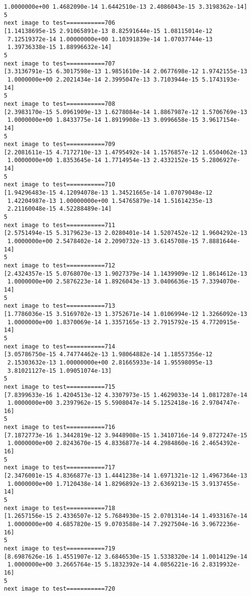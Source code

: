 \documentclass[11pt]{article}
\begin{document}
\begin{Verbatim}[commandchars=\\\{\}]
 1.0000000e+00 1.4682090e-14 1.6442510e-13 2.4086043e-15 3.3198362e-14]
5
next image to test===========706
[1.14138695e-15 2.91065891e-13 8.82591644e-15 1.08115014e-12
 7.12519372e-14 1.00000000e+00 1.10391839e-14 1.07037744e-13
 1.39736338e-15 1.88996632e-14]
5
next image to test===========707
[3.3136791e-15 6.3017598e-13 1.9851610e-14 2.0677698e-12 1.9742155e-13
 1.0000000e+00 2.2021434e-14 2.3995047e-13 3.7103944e-15 5.1743193e-14]
5
next image to test===========708
[2.3983170e-15 5.0961909e-13 1.6278084e-14 1.8867987e-12 1.5706769e-13
 1.0000000e+00 1.8433775e-14 1.8919908e-13 3.0996658e-15 3.9617154e-14]
5
next image to test===========709
[2.2081611e-15 4.7172710e-13 1.4795492e-14 1.1576857e-12 1.6504062e-13
 1.0000000e+00 1.8353645e-14 1.7714954e-13 2.4332152e-15 5.2806927e-14]
5
next image to test===========710
[1.94296483e-15 4.12094078e-13 1.34521665e-14 1.07079048e-12
 1.42204987e-13 1.00000000e+00 1.54765879e-14 1.51614235e-13
 2.21160048e-15 4.52288489e-14]
5
next image to test===========711
[2.5751494e-15 5.3179623e-13 2.0280401e-14 1.5207452e-12 1.9604292e-13
 1.0000000e+00 2.5478402e-14 2.2090732e-13 3.6145708e-15 7.8881644e-14]
5
next image to test===========712
[2.4324357e-15 5.0768070e-13 1.9027379e-14 1.1439909e-12 1.8614612e-13
 1.0000000e+00 2.5876223e-14 1.8926043e-13 3.0406636e-15 7.3394070e-14]
5
next image to test===========713
[1.7786036e-15 3.5169702e-13 1.3752671e-14 1.0106994e-12 1.3266092e-13
 1.0000000e+00 1.8370069e-14 1.3357165e-13 2.7915792e-15 4.7720915e-14]
5
next image to test===========714
[3.05786750e-15 4.74774462e-13 1.98064882e-14 1.18557356e-12
 2.15303632e-13 1.00000000e+00 2.81665933e-14 1.95598095e-13
 3.81021127e-15 1.09051074e-13]
5
next image to test===========715
[7.8399633e-16 1.4204513e-12 4.3307973e-15 1.4629033e-14 1.0817287e-14
 1.0000000e+00 3.2397962e-15 5.5908047e-14 5.1252418e-16 2.9704747e-16]
5
next image to test===========716
[7.1872773e-16 1.3442819e-12 3.9448908e-15 1.3410716e-14 9.8727247e-15
 1.0000000e+00 2.8243670e-15 4.8336877e-14 4.2984860e-16 2.4654392e-16]
5
next image to test===========717
[2.3476001e-15 4.8366877e-13 1.4441238e-14 1.6971321e-12 1.4967364e-13
 1.0000000e+00 1.7120438e-14 1.8296892e-13 2.6369213e-15 3.9137455e-14]
5
next image to test===========718
[1.2657156e-15 2.4336507e-12 5.7684930e-15 2.0701314e-14 1.4933167e-14
 1.0000000e+00 4.6857820e-15 9.0703588e-14 7.2927504e-16 3.9672236e-16]
5
next image to test===========719
[8.6987626e-16 1.4551907e-12 3.6846530e-15 1.5338320e-14 1.0014129e-14
 1.0000000e+00 3.2665764e-15 5.1832392e-14 4.0856221e-16 2.8319932e-16]
5
next image to test===========720

\end{Verbatim}
\end{document}
